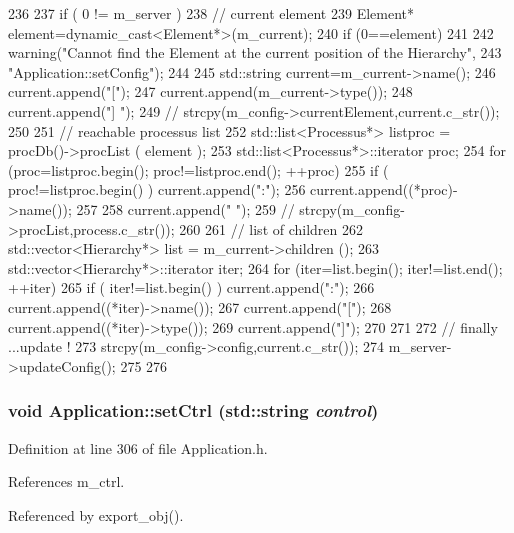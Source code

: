 \begin{DoxyCode}
236                              {
237   if ( 0 != m_server ) {
238     // current element
239     Element* element=dynamic_cast<Element*>(m_current);
240     if (0==element)
241       {
242     warning("Cannot find the Element at the current position of the Hierarchy",
243         "Application::setConfig");
244       }
245     std::string current=m_current->name();
246     current.append("[");
247     current.append(m_current->type());
248     current.append("] ");
249     //    strcpy(m_config->currentElement,current.c_str());
250 
251     // reachable processus list
252     std::list<Processus*> listproc = procDb()->procList ( element );
253     std::list<Processus*>::iterator proc;
254     for (proc=listproc.begin(); proc!=listproc.end(); ++proc) {
255       if ( proc!=listproc.begin() ) { current.append(":"); }
256       current.append((*proc)->name());
257     }
258     current.append(" ");
259     //    strcpy(m_config->procList,process.c_str());
260 
261     // list of children
262     std::vector<Hierarchy*> list = m_current->children ();
263     std::vector<Hierarchy*>::iterator iter;
264     for (iter=list.begin(); iter!=list.end(); ++iter) {
265       if ( iter!=list.begin() ) { current.append(":"); }
266       current.append((*iter)->name());
267       current.append("[");
268       current.append((*iter)->type());
269       current.append("]");
270     }
271 
272     // finally ...update !
273     strcpy(m_config->config,current.c_str());
274     m_server->updateConfig();
275   }
276 }
\end{DoxyCode}
\hypertarget{classApplication_a451a04a80f59a76fb13b6fae6c07439a}{
\subsubsection[{setCtrl}]{\setlength{\rightskip}{0pt plus 5cm}void Application::setCtrl (std::string {\em control})}}
\label{classApplication_a451a04a80f59a76fb13b6fae6c07439a}


Definition at line 306 of file Application.h.

References m\_\-ctrl.

Referenced by export\_\-obj().


